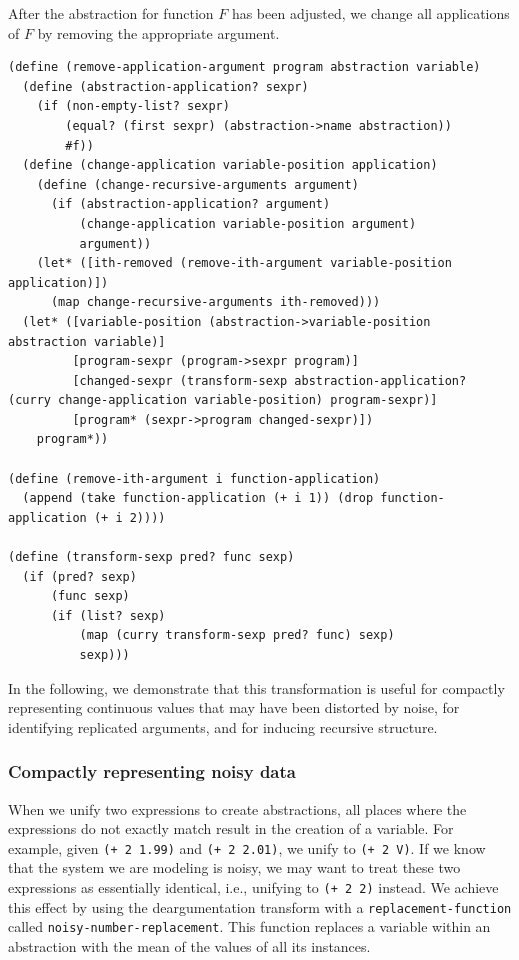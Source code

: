 \documentclass[a4paper,10pt]{article}
\begin{document}
After the abstraction for function $F$ has been adjusted, we change all applications of $F$ by removing the appropriate argument.
\begin{lstlisting}[frame=trbl]
(define (remove-application-argument program abstraction variable)
  (define (abstraction-application? sexpr)
    (if (non-empty-list? sexpr)
        (equal? (first sexpr) (abstraction->name abstraction))
        #f))
  (define (change-application variable-position application)
    (define (change-recursive-arguments argument)
      (if (abstraction-application? argument)
          (change-application variable-position argument)
          argument))
    (let* ([ith-removed (remove-ith-argument variable-position application)])
      (map change-recursive-arguments ith-removed)))
  (let* ([variable-position (abstraction->variable-position abstraction variable)]
         [program-sexpr (program->sexpr program)]
         [changed-sexpr (transform-sexp abstraction-application? (curry change-application variable-position) program-sexpr)]
         [program* (sexpr->program changed-sexpr)])
    program*))

(define (remove-ith-argument i function-application)
  (append (take function-application (+ i 1)) (drop function-application (+ i 2))))

(define (transform-sexp pred? func sexp)
  (if (pred? sexp)
      (func sexp)
      (if (list? sexp)
          (map (curry transform-sexp pred? func) sexp)
          sexp)))
\end{lstlisting}
In the following, we demonstrate that this transformation is useful for compactly representing continuous values that may have been distorted by noise, for identifying replicated arguments, and for inducing recursive structure.

\subsubsection{Compactly representing noisy data}

When we unify two expressions to create abstractions, all places where the expressions do not exactly match result in the creation of a variable. For example, given \texttt{(+ 2 1.99)} and \texttt{(+ 2 2.01)}, we unify to \texttt{(+ 2 V)}. If we know that the system we are modeling is noisy, we may want to treat these two expressions as essentially identical, i.e., unifying to \texttt{(+ 2 2)} instead. We achieve this effect by using the deargumentation transform with a \texttt{replacement-function} called \texttt{noisy-number-replacement}. This function replaces a variable within an abstraction with the mean of the values of all its instances.
\end{document}
